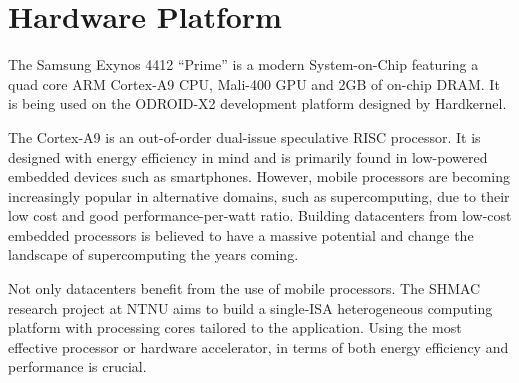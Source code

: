 \section{Hardware Platform}

The Samsung Exynos 4412 ``Prime'' is a modern System-on-Chip featuring a quad
core ARM Cortex-A9 CPU, Mali-400 GPU and 2GB of on-chip DRAM. It is being used
on the ODROID-X2 development platform designed by Hardkernel.

The Cortex-A9 is an out-of-order dual-issue speculative RISC processor. It is
designed with energy efficiency in mind and is primarily found in low-powered
embedded devices such as smartphones. However, mobile processors are becoming
increasingly popular in alternative domains, such as supercomputing, due to
their low cost and good performance-per-watt ratio. Building datacenters from
low-cost embedded processors is believed to have a massive potential and change
the landscape of supercomputing the years coming.

Not only datacenters benefit from the use of mobile processors. The SHMAC
research project at NTNU aims to build a single-ISA heterogeneous computing
platform with processing cores tailored to the application. Using the most
effective processor or hardware accelerator, in terms of both energy efficiency
and performance is crucial.
